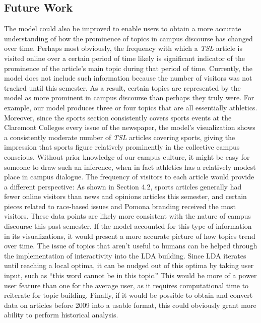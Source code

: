 \documentclass[a4paper]{article}
\begin{document}
\subsection{Future Work}
The model could also be improved to enable users to obtain a more accurate understanding of how the prominence of topics in campus discourse has changed over time. Perhaps most obviously, the frequency with which a \textit{TSL} article is visited online over a certain period of time likely is significant indicator of the prominence of the article's main topic during that period of time. Currently, the model does not include such information because the number of visitors was not tracked until this semester. As a result, certain topics are represented by the model as more prominent in campus discourse than perhaps they truly were. For example, our model produces three or four topics that are all essentially athletics. Moreover, since the sports section consistently covers sports events at the Claremont Colleges every issue of the newspaper, the model's visualization shows a consistently moderate number of \textit{TSL} articles covering sports, giving the impression that sports figure relatively prominently in the collective campus conscious. Without prior knowledge of our campus culture, it might be easy for someone to draw such an inference, when in fact athletics has a relatively modest place in campus dialogue. The frequency of visitors to each article would provide a different perspective: As shown in Section 4.2, sports articles generally had fewer online visitors than news and opinions articles this semester, and certain pieces related to race-based issues and Pomona branding received the most visitors. These data points are likely more consistent with the nature of campus discourse this past semester. If the model accounted for this type of information in its visualizations, it would present a more accurate picture of how topics trend over time. The issue of topics that aren't useful to humans can be helped through the implementation of interactivity into the LDA building. Since LDA iterates until reaching a local optima, it can be nudged out of this optima by taking user input, such as ``this word cannot be in this topic.'' This would be more of a power user feature than one for the average user, as it requires computational time to reiterate for topic building. Finally, if it would be possible to obtain and convert data on articles before 2009 into a usable format, this could obviously grant more ability to perform historical analysis.
\end{document}
